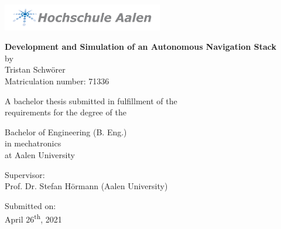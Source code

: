 \begin{titlepage}

\center\includegraphics[width=70mm]{Pictures/Logo_HSAA}

\vspace*{8mm} %
\begin{center} %
	
	\Huge\center\textbf{Development and Simulation of an Autonomous Navigation Stack}\\ %
	\vspace*{11mm}
	\Large{by}\\
	\Large{Tristan Schwörer}\\
	\Large{Matriculation number: 71336}\\
	
	\vspace*{11mm}
	
	\Large{A bachelor thesis submitted in fulfillment of the}\\
	\Large{requirements for the degree of the}\\
	
	\vspace*{11mm}
	
	\Large{Bachelor of Engineering (B. Eng.)}\\
	\Large{in mechatronics}\\
	\Large{at Aalen University}\\
	
	\vspace*{11mm}
	
	\Large{Supervisor:}\\
	\Large{Prof. Dr. Stefan Hörmann (Aalen University)}\\
	
	\vspace*{11mm}
	
	\Large{Submitted on:}\\
	\Large{April 26\textsuperscript{th}, 2021}\\
\end{center}
\end{titlepage}
